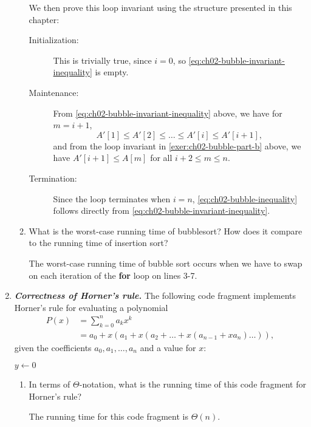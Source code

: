 \documentclass[Chapter02]{subfiles}
\begin{document}
\begin{enumerate}[leftmargin=\labelsep,label={\textbf{\thesection-\arabic*}}]
\begin{enumerate}[resume]
\begin{answer}
				We then prove this loop invariant using the structure presented in this chapter:
				\begin{description}
					\item[Initialization:] This is trivially true, since $i = 0$, so \cref{eq:ch02-bubble-invariant-inequality} is empty.

					\item[Maintenance:] From \cref{eq:ch02-bubble-invariant-inequality} above, we have for $m = i + 1$,
					\[
						A'[1] \leq A'[2] \leq \dots \leq A'[i] \leq A'[i + 1],
					\]
					and from the loop invariant in \cref{exer:ch02-bubble-part-b} above, we have $A'[i + 1] \leq A[m]$ for all $i + 2 \leq m \leq n$.

					\item[Termination:] Since the loop terminates when $i = n$, \cref{eq:ch02-bubble-inequality} follows directly from \cref{eq:ch02-bubble-invariant-inequality}.
				\end{description}
			\end{answer}
			
			\item What is the worst-case running time of bubblesort? How does it compare to the running time of insertion sort?
			\begin{answer}
				The worst-case running time of bubble sort occurs when we have to swap on each iteration of the \textbf{for} loop on lines 3-7.
			\end{answer}
			
		\end{enumerate}
		
		\item \textbf{\textit{Correctness of Horner's rule.}} The following code fragment implements Horner's rule for evaluating a polynomial
		\begin{align*}
			P(x) &= \sum_{k = 0}^n a_kx^k\\
				&= a_0 + x(a_1 + x(a_2 + \dots + x(a_{n - 1} + xa_n) \dots)),
		\end{align*}
		given the coefficients $a_0, a_1, \dots, a_n$ and a value for $x$:

		\begin{algorithm}[H]
			$y \leftarrow 0$\;
		\end{algorithm}
		\begin{enumerate}
			\item In terms of $\Theta$-notation, what is the running time of this code fragment for Horner's rule?
			\begin{answer}
				The running time for this code fragment is $\Theta(n)$.
			\end{answer}


\end{enumerate}
\end{enumerate}
\end{document}
